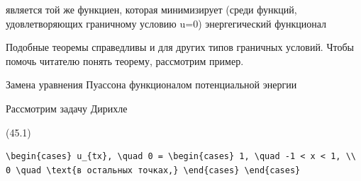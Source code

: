 \documentclass[
  ukrainian,
]{article}
\begin{document}
является той же функциен, которая минимизирует (среди функций,
удовлетворяющих граничному условию u=0) энергегический функционал

Подобные теоремы справедливы и для других типов граничных условий. Чтобы
помочь читателю понять теорему, рассмотрим пример.

Замена уравнения Пуассона функционалом потенциальной энергии

Рассмотрим задачу Дирихле

(45.1)

\begin{verbatim}
\begin{cases} u_{tx}, \quad 0 = \begin{cases} 1, \quad -1 < x < 1, \\ 0 \quad \text{в остальных точках,} \end{cases} \end{cases}
\end{verbatim}
\end{document}
